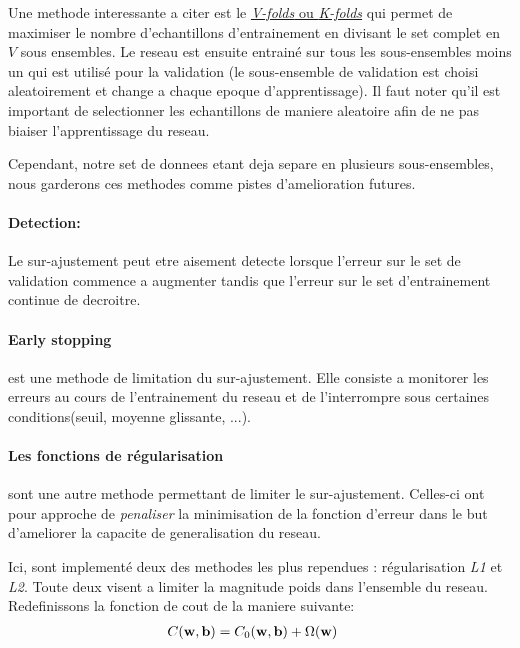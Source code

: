 \documentclass[11pt]{article}
\begin{document}
Une methode interessante a citer est le \href{http://work.caltech.edu/slides/slides13.pdf}
{\emph{V-folds} ou \emph{K-folds}} qui permet de maximiser le nombre d'echantillons
d'entrainement en divisant le set complet en $V$ sous ensembles. Le reseau est
ensuite entrain\'e sur tous les sous-ensembles moins un qui est utilis\'e pour la
validation (le sous-ensemble de validation est choisi aleatoirement et change
a chaque epoque d'apprentissage). Il faut noter qu'il est important de
selectionner les echantillons de maniere aleatoire afin de ne pas biaiser
l'apprentissage du reseau.

Cependant, notre set de donnees etant deja separe en plusieurs sous-ensembles,
nous garderons ces methodes comme pistes d'amelioration futures.

\paragraph{Detection: }Le sur-ajustement peut etre aisement detecte lorsque
l'erreur sur le set de validation commence a augmenter tandis que l'erreur sur
le set d'entrainement continue de decroitre.
\paragraph{Early stopping} est une methode de limitation du sur-ajustement. Elle
consiste a monitorer les erreurs au cours de l'entrainement du reseau et
de l'interrompre sous certaines conditions(seuil, moyenne glissante, ...).

\paragraph{Les fonctions de r\'egularisation} sont une autre methode permettant
de limiter le sur-ajustement. Celles-ci ont pour approche de \emph{penaliser}
la minimisation de la fonction d'erreur dans le but d'ameliorer la capacite de
generalisation du reseau.

Ici, sont implement\'e deux des methodes les plus rependues :
r\'egularisation \emph{L1} et \emph{L2}. Toute deux visent a limiter
la magnitude poids dans l'ensemble du reseau.
Redefinissons la fonction de cout de la maniere suivante:
\begin{equation}
	\begin{aligned}
		C({\bf w}, {\bf b}) &= C_0({\bf w}, {\bf b}) + \Omega({\bf w})
	\end{aligned}
\end{equation}
\end{document}
